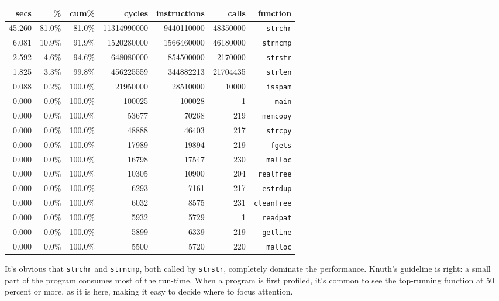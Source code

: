 \begin{tabular}{rrrrrrr}
    secs    & \%    & cum\% & cycles    & instructions  & calls & function
    \\
    \hline
    \hline
    45.260  & 81.0\%    & 81.0\%    & 11314990000   & 9440110000    &
    48350000    & \verb'strchr' \\
    6.081   & 10.9\%    & 91.9\%    & 1520280000    & 1566460000    &
    46180000    & \verb'strncmp'    \\
    2.592   & 4.6\%     & 94.6\%    & 648080000     & 854500000     &
    2170000 & \verb'strstr' \\
    1.825   & 3.3\%     & 99.8\%    & 456225559     & 344882213     &
    21704435    & \verb'strlen' \\
    0.088   & 0.2\%     & 100.0\%   & 21950000      & 28510000      & 10000
    & \verb'isspam' \\
    0.000   & 0.0\%     & 100.0\%   & 100025    & 100028    & 1 &
    \verb'main'   \\
    0.000   & 0.0\%     & 100.0\%   & 53677     & 70268     & 219   &
    \verb'_memcopy' \\
    0.000   & 0.0\%     & 100.0\%   & 48888     & 46403     & 217   &
    \verb'strcpy'   \\
    0.000   & 0.0\%     & 100.0\%   & 17989     & 19894     & 219   &
    \verb'fgets'    \\
    0.000   & 0.0\%     & 100.0\%   & 16798     & 17547     & 230   &
    \verb'__malloc' \\
    0.000   & 0.0\%     & 100.0\%   & 10305     & 10900      & 204  &
    \verb'realfree' \\
    0.000   & 0.0\%     & 100.0\%   &  6293     & 7161      & 217   &
    \verb'estrdup'  \\
    0.000   & 0.0\%     & 100.0\%   & 6032      & 8575      & 231   &
    \verb'cleanfree'    \\
    0.000   & 0.0\%     & 100.0\%   & 5932      & 5729      & 1     &
    \verb'readpat'  \\
    0.000   & 0.0\%     & 100.0\%   & 5899      & 6339      & 219   &
    \verb'getline'  \\
    0.000   & 0.0\%     & 100.0\%   & 5500      & 5720      & 220   &
    \verb'_malloc'  \\
\end{tabular}

It's obvious that \verb'strchr' and \verb'strncmp', both called by
\verb'strstr', completely dominate the performance. Knuth's guideline is
right: a small part of the program consumes most of the run-time. When a
program is first profiled, it's common to see the top-running function at
50 percent or more, as it is here, making it easy to decide where to focus
attention.

